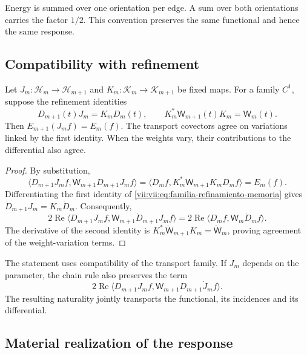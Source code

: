 Energy is summed over one orientation per edge. A sum over both
orientations carries the factor \(1/2\). This convention preserves the same
functional and hence the same response.

\subsection{Compatibility with refinement}
\label{vii:vii:subsec:refinamiento-respuesta}

\begin{theorem}
\label{vii:vii:thm:refinamiento-respuesta}
Let \(J_m:\mathcal H_m\to\mathcal H_{m+1}\) and
\(K_m:\mathcal K_m\to\mathcal K_{m+1}\) be fixed maps.
For a family \(C^1\), suppose the refinement identities
\begin{equation}
 D_{m+1}(t)J_m=K_mD_m(t),\qquad
 K_m^*\mathsf W_{m+1}(t)K_m=\mathsf W_m(t).
 \label{vii:vii:eq:familia-refinamiento-memoria}
\end{equation}
Then \(E_{m+1}(J_mf)=E_m(f)\).
The transport covectors agree on variations linked by
the first identity. When the weights vary, their contributions
to the differential also agree.
\end{theorem}

\begin{proof}
By substitution,
\[
 \langle D_{m+1}J_mf,\mathsf W_{m+1}D_{m+1}J_mf\rangle
 =\langle D_mf,K_m^*\mathsf W_{m+1}K_mD_mf\rangle=E_m(f).
\]
Differentiating the first identity of
\eqref{vii:vii:eq:familia-refinamiento-memoria} gives
\(\dot D_{m+1}J_m=K_m\dot D_m\). Consequently,
\[
 2\operatorname{Re}
 \langle D_{m+1}J_mf,\mathsf W_{m+1}\dot D_{m+1}J_mf\rangle
 =2\operatorname{Re}\langle D_mf,\mathsf W_m\dot D_mf\rangle.
\]
The derivative of the second identity is
\(K_m^*\dot{\mathsf W}_{m+1}K_m=\dot{\mathsf W}_m\), proving
agreement of the weight-variation terms.
\end{proof}

The statement uses compatibility of the transport family.
If \(J_m\) depends on the parameter, the chain rule also
preserves the term
\[
 2\operatorname{Re}
 \langle D_{m+1}J_mf,\mathsf W_{m+1}D_{m+1}\dot J_mf\rangle.
\]
The resulting naturality jointly transports the functional, its
incidences and its differential.

\subsection{Material realization of the response}
\label{vii:vii:subsec:realizacion-respuesta-discreta}

